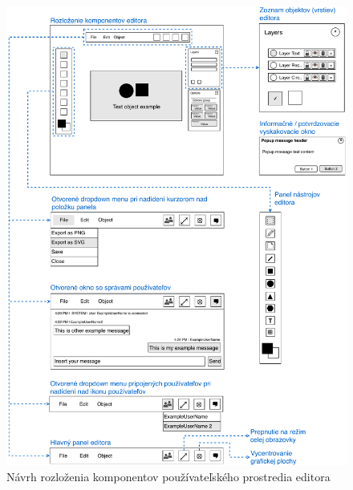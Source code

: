 \begin{figure}[h]
	\centerline{\includegraphics[width=1\textwidth]{images/diagrams/editor_wireframe_base}}
	\caption[Rozloženie komponentov editora]{Návrh rozloženia komponentov používateľského prostredia editora}
	\label{obr:editorWireframeBase}
\end{figure}
\FloatBarrier

